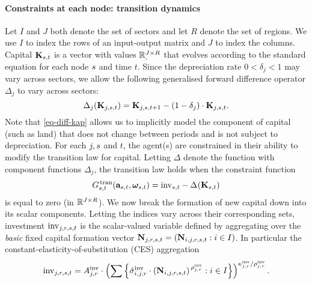 \documentclass[12pt,a4paper,twoside, draft]{article}
\begin{document}
\paragraph{Constraints at each node: transition dynamics}
Let $I$ and $J$ both denote the set of sectors and let $R$ denote the set of
regions.
We use $I$ to index the rows of an input-output matrix and $J$ to index the
columns.
Capital $\mathbf{K}_{{s}, t}$ is a vector with values
$\nnreal ^ {J \times R}$ that evolves according to the standard equation for
each node ${s}$ and time $t$.
Since the depreciation rate $0 < \delta_{j} < 1$ may vary across sectors, we
allow the following generalised forward difference operator $\Delta_j$ to vary
across sectors:
\begin{equation}\label{eq-diff-kap}
  \Delta_{j}(\mathbf{K}_{j, {s}, t})
    = \mathbf{K}_{j, {s}, t + 1} -
      (1 - \delta_j) \cdot \mathbf{K}_{j, {s}, t}. 
\end{equation}
Note that \eqref{eq-diff-kap} allows us to implicitly model the component of
capital (such as land) that does not change between periods and is not subject
to depreciation.
For each $j, {s} $ and $t$, the agent(s) are constrained in their ability to
modify the transition law for capital.
Letting $\Delta$ denote the function with component functions
$\Delta_{j}$, the transition law holds when the constraint function
\begin{equation}\label{eq-kapital}
  G_{{s}, t}^{\,\textup{tran}}(
    \mathbf{a}_{{s}, t}, \boldsymbol{\omega}_{{s}, t}
  )
    = \textup{inv}_{{s}, t}
      - \Delta_{}(\mathbf{K}_{{s}, t})
\end{equation}
is equal to zero (in $\mathbb R^{J \times R}$).
We now break the formation of new capital down into its scalar components.
Letting the indices vary across their corresponding sets, investment
$\textup{inv}_{j, r, {s}, t}$ is the scalar-valued variable defined by
aggregating over the \emph{basic} fixed capital formation vector
$\mathbf{N}_{j, r, {s}, t} = (\mathbf{N}_{i,j, r, {s}, t}: i \in I)$.
In particular the constant-elasticity-of-substitution (CES) aggregation
\begin{equation}\label{eq-ces-inv}
  \textup{inv}_{j, r, \node, t} = A_{j, r}^{\textup{inv}}
    \cdot \left(\sum%
      \left\{
      \acute \sigma_{i,j, r}^{\textup{inv}}
        \cdot \left( \mathbf{N}_{i,j, r, \node, t}\right)
        ^ {\,\rho_{j, r} ^ {\textup{inv}}}
      : i \in I\right\}
    \right) ^ {\kappa_{j, r}^{\textup{inv}} / \rho_{j, r}^{\textup{inv}}}.
\end{equation}
\end{document}
